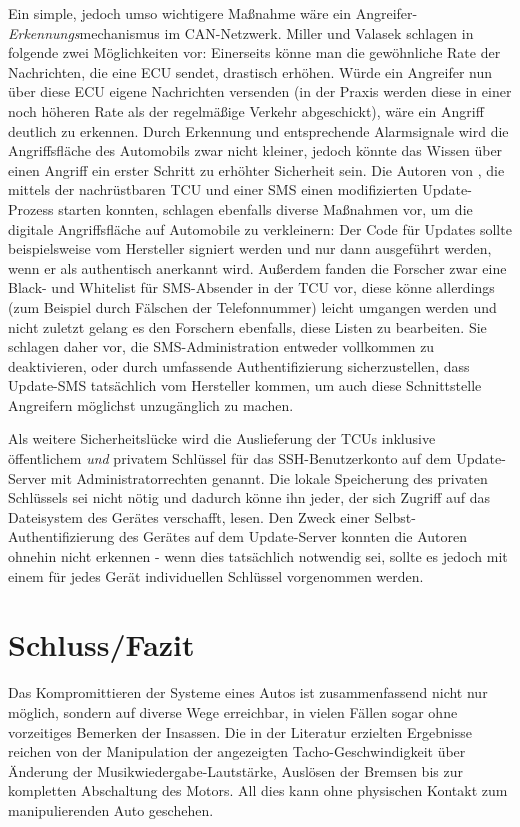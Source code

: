 \documentclass[
    fontsize=12pt,
    headings=small,
    parskip=half,           %
    bibliography=totoc,
    numbers=noenddot,       %
    open=any,               %
    ]{scrreprt}
\begin{document}
Ein simple, jedoch umso wichtigere Maßnahme wäre ein Angreifer-\textit{Erkennungs}mechanismus im CAN-Netzwerk. Miller und Valasek schlagen in \cite{MiV14} folgende zwei Möglichkeiten vor: Einerseits könne man die gewöhnliche Rate der Nachrichten, die eine ECU sendet, drastisch erhöhen. Würde ein Angreifer nun über diese ECU eigene Nachrichten versenden (in der Praxis werden diese in einer noch höheren Rate als der regelmäßige Verkehr abgeschickt), wäre ein Angriff deutlich zu erkennen. Durch Erkennung und entsprechende Alarmsignale wird die Angriffsfläche des Automobils zwar nicht kleiner, jedoch könnte das Wissen über einen Angriff ein erster Schritt zu erhöhter Sicherheit sein.
Die Autoren von \cite{FPK15}, die mittels der nachrüstbaren TCU und einer SMS einen modifizierten Update-Prozess starten konnten, schlagen ebenfalls diverse Maßnahmen vor, um die digitale Angriffsfläche auf Automobile zu verkleinern: Der Code für Updates sollte beispielsweise vom Hersteller signiert werden und nur dann ausgeführt werden, wenn er als authentisch anerkannt wird. Außerdem fanden die Forscher zwar eine Black- und Whitelist für SMS-Absender in der TCU vor, diese könne allerdings (zum Beispiel durch Fälschen der Telefonnummer) leicht umgangen werden und nicht zuletzt gelang es den Forschern ebenfalls, diese Listen zu bearbeiten. Sie schlagen daher vor, die SMS-Administration entweder vollkommen zu deaktivieren, oder durch umfassende Authentifizierung sicherzustellen, dass Update-SMS tatsächlich vom Hersteller kommen, um auch diese Schnittstelle Angreifern möglichst unzugänglich zu machen.\par
Als weitere Sicherheitslücke wird die Auslieferung der TCUs inklusive öffentlichem \textit{und} privatem Schlüssel für das SSH-Benutzerkonto auf dem Update-Server mit Administratorrechten genannt. Die lokale Speicherung des privaten Schlüssels sei nicht nötig und dadurch könne ihn jeder, der sich Zugriff auf das Dateisystem des Gerätes verschafft, lesen. Den Zweck einer Selbst-Authentifizierung des Gerätes auf dem Update-Server konnten die Autoren ohnehin nicht erkennen - wenn dies tatsächlich notwendig sei, sollte es jedoch mit einem für jedes Gerät individuellen Schlüssel vorgenommen werden.

\chapter{Schluss/Fazit}

Das Kompromittieren der Systeme eines Autos ist zusammenfassend nicht nur möglich, sondern auf diverse Wege erreichbar, in vielen Fällen sogar ohne vorzeitiges Bemerken der Insassen. Die in der Literatur erzielten Ergebnisse reichen von der Manipulation der angezeigten Tacho-Geschwindigkeit über Änderung der Musikwiedergabe-Lautstärke, Auslösen der Bremsen bis zur kompletten Abschaltung des Motors. All dies kann ohne physischen Kontakt zum manipulierenden Auto geschehen.
\end{document}
